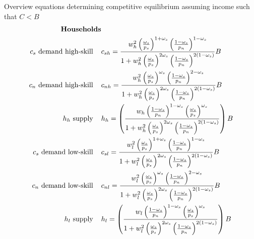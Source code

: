 \newpage
Overview equations determining competitive equilibrium assuming income such that $C<B$
\begin{align}
\text{\textbf{Households}}& \nonumber \\
\text{$c_s$ demand high-skill}\hspace{4mm}&c_{sh}=\frac{w_h^2\left(\frac{\omega_s}{p_s}\right)^{1+\omega_s}\left(\frac{1-\omega_s}{p_n}\right)^{1-\omega_s}}{1+w_h^2\left(\frac{\omega_s}{p_s}\right)^{2\omega_s}\left(\frac{1-\omega_s}{p_n}\right)^{2(1-\omega_s)}}B\\
\text{$c_n$ demand high-skill}\hspace{4mm}&c_{nh} = \frac{w_h^2\left(\frac{\omega_s}{p_s}\right)^{\omega_s}\left(\frac{1-\omega_s}{p_n}\right)^{2-\omega_s}}{1+w_h^2\left(\frac{\omega_s}{p_s}\right)^{2\omega_s}\left(\frac{1-\omega_s}{p_n}\right)^{2(1-\omega_s)}}B\\
\text{$h_h$ supply}\hspace{4mm}&
h_h= \left(\frac{w_h \left(\frac{1-\omega_s}{p_n}\right)^{1-\omega_s}\left(\frac{\omega_s}{p_s}\right)^{\omega_s}}{1+w_h^2\left(\frac{\omega_s}{p_s}\right)^{2\omega_s}\left(\frac{1-\omega_s}{p_n}\right)^{2(1-\omega_s)}}\right)B\\
\text{$c_s$ demand low-skill}\hspace{4mm}&c_{sl}=\frac{w_l^2\left(\frac{\omega_s}{p_s}\right)^{1+\omega_s}\left(\frac{1-\omega_s}{p_n}\right)^{1-\omega_s}}{1+w_l^2\left(\frac{\omega_s}{p_s}\right)^{2\omega_s}\left(\frac{1-\omega_s}{p_n}\right)^{2(1-\omega_s)}}B\\
\text{$c_n$ demand low-skill}\hspace{4mm}&c_{nl}=\frac{w_l^2\left(\frac{\omega_s}{p_s}\right)^{\omega_s}\left(\frac{1-\omega_s}{p_n}\right)^{2-\omega_s}}{1+w_l^2\left(\frac{\omega_s}{p_s}\right)^{2\omega_s}\left(\frac{1-\omega_s}{p_n}\right)^{2(1-\omega_s)}}B\\
\text{$h_l$ supply}\hspace{4mm}& h_l= \left(\frac{w_l \left(\frac{1-\omega_s}{p_n}\right)^{1-\omega_s}\left(\frac{\omega_s}{p_s}\right)^{\omega_s}}{1+w_l^2\left(\frac{\omega_s}{p_s}\right)^{2\omega_s}\left(\frac{1-\omega_s}{p_n}\right)^{2(1-\omega_s)}}\right)B
\end{align}
\newpage
